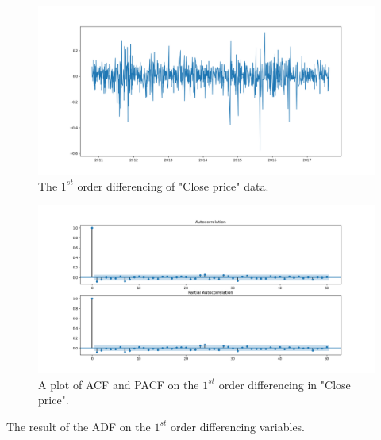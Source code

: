 \begin{figure}[H]
    \centering
    \begin{minipage}[b]{1\textwidth}
        \includegraphics[width=\textwidth]{figures/Ass2/Ass2_Q3_1diff_Close_signal.png}
    \end{minipage}
    \caption{The $1^{st}$ order differencing of "Close price" data.}
    \label{fig:Ass2_Q3_1diff_Close_signal}
\end{figure}

\begin{figure}[H]
    \centering
    \begin{minipage}[b]{1\textwidth}
        \includegraphics[width=\textwidth]{figures/Ass2/Ass2_Q3_PACF_ACF_1diff.png}
    \end{minipage}
    \caption{A plot of \gls{ACF} and \gls{PACF} on the $1^{st}$ order differencing in "Close price".}
    \label{fig:Ass2_Q3_PACF_ACF_1diff}
\end{figure}

\begin{table}[H]
\centering
\caption{The result of the \gls{ADF} on the $1^{st}$ order differencing variables.}
\label{tab:Ass2_Q3_ADF_results2}

\end{table}

